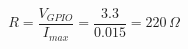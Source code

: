 \documentclass[border=8pt]{standalone}
\begin{document}
$$ R = \frac{V_{GPIO}}{I_{max}} = \frac{3.3}{0.015} = 220\,\Omega $$
\end{document}
